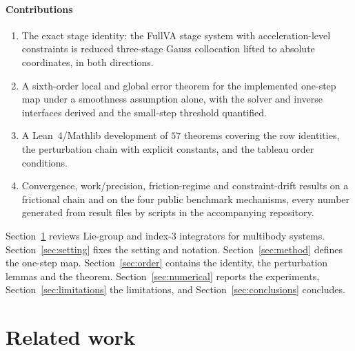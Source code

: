 \documentclass[preprint,12pt]{elsarticle}
\begin{document}
\paragraph{Contributions}
\begin{enumerate}
  \item The exact stage identity: the FullVA stage system with acceleration-level constraints is
  reduced three-stage Gauss collocation lifted to absolute coordinates, in both directions.
  \item A sixth-order local and global error theorem for the implemented one-step map under a
  smoothness assumption alone, with the solver and inverse interfaces derived and the small-step
  threshold quantified.
  \item A Lean~4/Mathlib development of $57$ theorems covering the row identities, the perturbation
  chain with explicit constants, and the tableau order conditions.
  \item Convergence, work/precision, friction-regime and constraint-drift results on a frictional
  chain and on the four public benchmark mechanisms, every number generated from result files by
  scripts in the accompanying repository.
\end{enumerate}

Section~\ref{sec:related} reviews Lie-group and index-3 integrators for multibody systems.
Section~\ref{sec:setting} fixes the setting and notation. Section~\ref{sec:method} defines the
one-step map. Section~\ref{sec:order} contains the identity, the perturbation lemmas and the
theorem. Section~\ref{sec:numerical} reports the experiments, Section~\ref{sec:limitations} the
limitations, and Section~\ref{sec:conclusions} concludes.

\section{Related work}
\label{sec:related}
\end{document}
